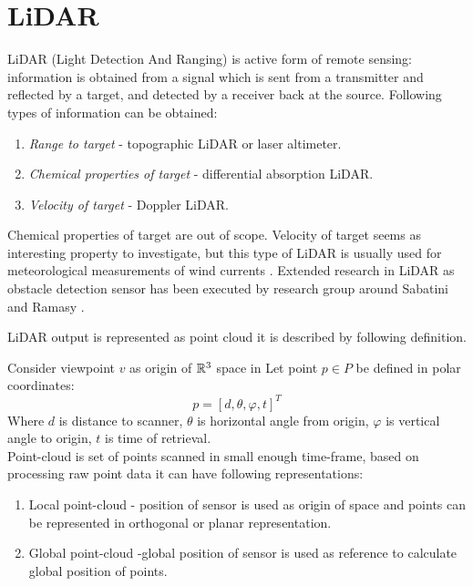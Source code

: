 \section{LiDAR}
\noindent LiDAR (Light Detection And Ranging) is active form of remote sensing: information is obtained from a signal which is sent from a transmitter and reflected by a target, and detected by a receiver back at the source. Following types of information can be obtained:
\begin{enumerate}
\item \textit{Range to target} - topographic LiDAR or laser altimeter.
\item \textit{Chemical properties of target} - differential absorption LiDAR.
\item \textit{Velocity of target} - Doppler LiDAR.
\end{enumerate}

\noindent Chemical properties of target are out of scope. Velocity of  target seems as interesting property to investigate, but this type of LiDAR is usually used for meteorological measurements of wind currents \cite{martin2011meteorological}. Extended research in LiDAR as obstacle detection sensor has been executed by research group around Sabatini \cite{sabatini2014lidar} and Ramasy \cite{ramasamy2016lidar}. 

LiDAR output is represented as point cloud it is described by following definition.
\newpage\begin{definition}
Consider viewpoint $v$ as origin of $\mathbb{R}^3$ space in 
Let point $p \in P$ be defined in polar coordinates:
\begin{equation}
    p= [ d, \theta, \varphi, t ]^T
\end{equation}
Where $d$ is distance to scanner, $\theta$ is horizontal angle from origin, $\varphi$ is vertical angle to origin, $t$ is time of retrieval.\\

\noindent Point-cloud is set of points scanned in small enough time-frame, based on processing raw point data it can have following representations:
\begin{enumerate}
\item Local point-cloud - position of sensor is used as origin of space and points can be represented in orthogonal or planar representation. 
\item Global point-cloud -global position of sensor is used as reference to calculate global position of points.
\end{enumerate}
\end{definition}

